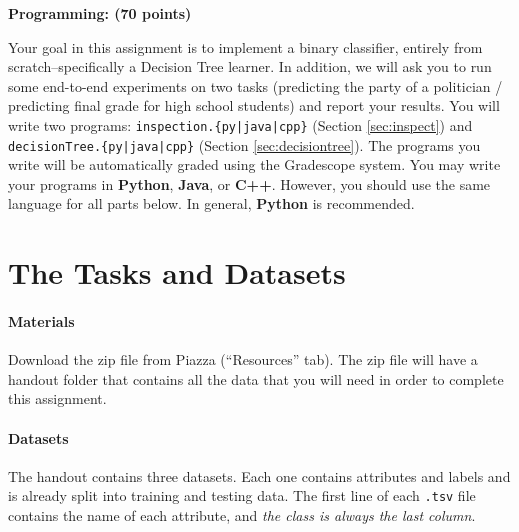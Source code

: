 \documentclass[11pt,addpoints,answers]{exam}
\begin{document}
{\LARGE \bf Programming: (70 points)}

Your goal in this assignment is to implement a binary classifier, entirely from scratch--specifically a Decision Tree learner. In addition, we will ask you to run some end-to-end experiments on two tasks (predicting the party of a politician / predicting final grade for high school students) and report your results.
%
You will write two programs: \texttt{inspection.\{py|java|cpp\}} (Section \ref{sec:inspect}) and \texttt{decisionTree.\{py|java|cpp\}} (Section \ref{sec:decisiontree}). The programs you write will be automatically graded using the Gradescope system. You may write your programs in \textbf{Python}, \textbf{Java}, or \textbf{C++}. However, you should use the same language for all parts below. In general, \textbf{Python} is recommended.

\section{The Tasks and Datasets}
\label{sec:data}

\paragraph{Materials} Download the zip file from Piazza (``Resources'' tab). The zip file will have a handout folder that contains all the data that you will need in order to complete this assignment.

\paragraph{Datasets}

The handout contains three datasets. Each one contains attributes and labels and is already split into training and testing data. The first line of each \lstinline{.tsv} file contains the name of each attribute, and \emph{the class is always the last column}.
\end{document}
